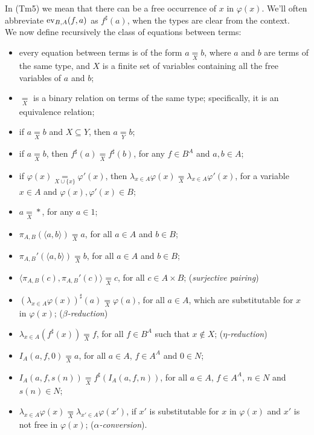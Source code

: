 \begin{definition}
\begin{itemize}
    \end{itemize}
    In (Tm5) we mean that there can be a free occurrence of $x$ in $\varphi(x)$.
    We'll often abbreviate $\operatorname{ev}_{B,A}(f,a)$ as $f^\sharp(a)$, when the types are clear from the context.\\\label{idx:term-evaluation}
    We now define recursively the class of equations between terms:
    \begin{itemize}
        \item[(Eq0)] every equation between terms is of the form $a \underset{X}{=} b$, where $a$ and $b$ are terms of the same type,\label{idx:term-equality}
        and $X$ is a finite set of variables containing all the free variables of $a$ and $b$;
        \item[(Eq1)] $\underset{X}{=}$ is a binary relation on terms of the same type; specifically, it is an equivalence relation;
        \item[(Eq2)] if $a \underset{X}{=} b$ and $X \subseteq Y$, then $a \underset{Y}{=} b$;
        \item[(Eq3a)] if $a \underset{X}{=} b$, then $f^\sharp(a) \underset{X}{=} f^\sharp(b)$, for any $f \in B^A$ and $a,b \in A$;
        \item[(Eq3b)] if $\varphi(x) \underset{X \cup\{x\}}{=} \varphi'(x)$, then $\lambda_{x \in A} \varphi(x) \underset{X}{=} \lambda_{x \in A} \varphi'(x)$, for a variable $x \in A$ and $\varphi(x),\varphi'(x) \in B$;
        \item[(Eq4)] $a \underset{X}{=} *$, for any $a \in 1$;
        \item[(Eq5a)] $\pi_{A,B}(\langle a,b\rangle) \underset{X}{=} a$, for all $a \in A$ and $b \in B$;
        \item[(Eq5b)] $\pi_{A,B}'(\langle a,b\rangle) \underset{X}{=} b$, for all $a \in A$ and $b \in B$;
        \item[(Eq5c)] $\langle \pi_{A,B}(c),\pi_{A,B}'(c)\rangle \underset{X}{=} c$, for all $c \in A \times B$; (\emph{surjective pairing})
        \item[(Eq6a)] $(\lambda_{x \in A} \varphi(x))^\sharp(a) \underset{X}{=} \varphi(a)$, for all $a \in A$, which are substitutable for $x$ in $\varphi(x)$; (\emph{$\beta$-reduction})
        \item[(Eq6b)] $\lambda_{x \in A}(f^\sharp(x)) \underset{X}{=} f$, for all $f \in B^A$ such that $x \notin X$; (\emph{$\eta$-reduction})
        \item[(Eq7a)] $I_A(a,f,0) \underset{X}{=} a$, for all $a \in A$, $f \in A^A$ and $0 \in N$;
        \item[(Eq7b)] $I_A(a,f,s(n)) \underset{X}{=} f^\sharp(I_A(a,f,n))$, for all $a \in A$, $f \in A^A$, $n \in N$ and $s(n) \in N$;
        \item[(Eq8)] $\lambda_{x \in A} \varphi(x) \underset{X}{=} \lambda_{x' \in A} \varphi(x')$, if $x'$ is substitutable for $x$ in $\varphi(x)$ and $x'$ is not free in $\varphi(x)$; (\emph{$\alpha$-conversion}).
    \end{itemize}
\end{definition}

